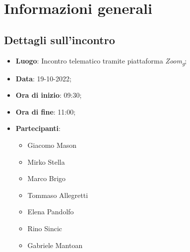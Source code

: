 \section{Informazioni generali}

\subsection{Dettagli sull'incontro}
\begin{itemize}
\item \textbf{Luogo}: Incontro telematico tramite piattaforma \textit{Zoom\textsubscript{g}};
\item \textbf{Data}: 19-10-2022;
\item \textbf{Ora di inizio}: 09:30;
\item \textbf{Ora di fine}: 11:00;
\item \textbf{Partecipanti}: 
\begin{itemize}
	\item Giacomo Mason
	\item Mirko Stella
	\item Marco Brigo
	\item Tommaso Allegretti
	\item Elena Pandolfo
	\item Rino Sincic
	\item Gabriele Mantoan
\end{itemize}
\end{itemize}



